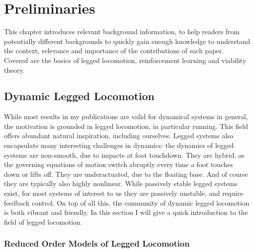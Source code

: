
\chapter{Preliminaries} \label{chap:prelims}
This chapter introduces relevant background information, to help readers from potentially different backgrounds to quickly gain enough knowledge to understand the context, relevance and importance of the contributions of each paper. Covered are the basics of legged locomotion, reinforcement learning and viability theory.

\section{Dynamic Legged Locomotion}
While most results in my publications are valid for dynamical systems in general, the motivation is grounded in legged locomotion, in particular running. This field offers abundant natural inspiration, including ourselves. Legged systems also encapsulate many interesting challenges in dynamics: the dynamics of legged systems are non-smooth, due to impacts at foot touchdown. They are hybrid, as the governing equations of motion switch abruptly every time a foot touches down or lifts off. They are underactuated, due to the floating base. And of course they are typically also highly nonlinear. While passively stable legged systems exist, for most systems of interest to us they are passively unstable, and require feedback control.
On top of all this, the community of dynamic legged locomotion is both vibrant and friendly. In this section I will give a quick introduction to the field of legged locomotion.

\subsection{Reduced Order Models of Legged Locomotion}

